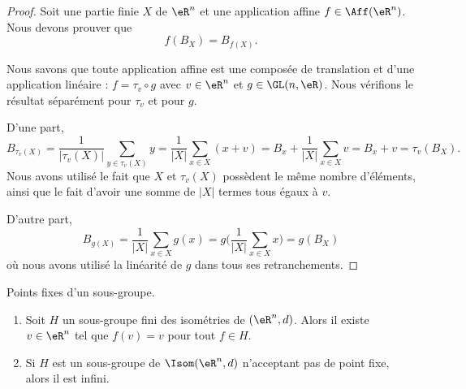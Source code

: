 \begin{proof}
	Soit une partie finie \( X\) de \( \eR^n\) et une application affine \( f\in\Aff(\eR^n)\). Nous devons prouver que
	\begin{equation}
		f(B_X)=B_{f(X)}.
	\end{equation}

	Nous savons que toute application affine est une composée de translation et d'une application linéaire : \( f=\tau_v\circ g\) avec \( v\in \eR^n\) et \( g\in \GL(n,\eR)\). Nous vérifions le résultat séparément pour \( \tau_v\) et pour \( g\).

	D'une part,
	\begin{equation}
		B_{\tau_v(X)}=\frac{1}{ | \tau_v(X) | }\sum_{y\in \tau_v(X)}y=\frac{1}{ | X | }\sum_{x\in X}(x+v)=B_x+\frac{1}{ | X | }\sum_{x\in X}v=B_x+v=\tau_v(B_X).
	\end{equation}
	Nous avons utilisé le fait que \( X\) et \( \tau_v(X)\) possèdent le même nombre d'éléments, ainsi que le fait d'avoir une somme de \( | X |\) termes tous égaux à \( v\).

	D'autre part,
	\begin{equation}
		B_{g(X)}=\frac{1}{ | X | }\sum_{x\in X}g(x)=g\big( \frac{1}{ |X | }\sum_{x\in X}x \big)=g(B_X)
	\end{equation}
	où nous avons utilisé la linéarité de \( g\) dans tous ses retranchements.
\end{proof}

\begin{proposition}     \label{PROPooLAEBooWdcBoe}
	Points fixes d'un sous-groupe.
	\begin{enumerate}
		\item
		      Soit \( H\) un sous-groupe fini des isométries de \( (\eR^n,d)\). Alors il existe \( v\in \eR^n\) tel que \( f(v)=v\) pour tout \( f\in H\).
		\item
		      Si \( H\) est un sous-groupe de \( \Isom(\eR^n,d)\) n'acceptant pas de point fixe, alors il est infini.
	\end{enumerate}
\end{proposition}


